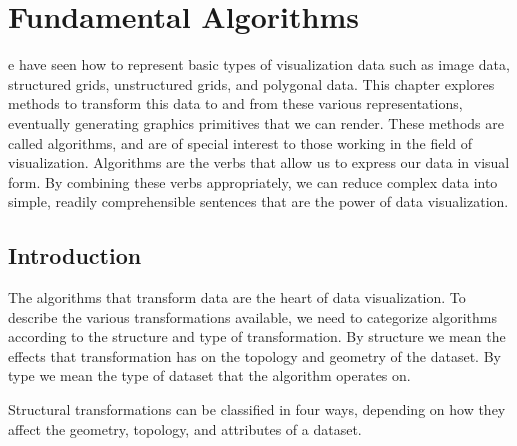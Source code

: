 \chapter{Fundamental Algorithms}
\label{chap:fundamental_algorithms}

e have seen how to represent basic types of visualization data such as image data, structured grids, unstructured grids, and polygonal data.
This chapter explores methods to transform this data to and from these various representations, eventually generating graphics primitives that we can render.
These methods are called algorithms, and are of special interest to those working in the field of visualization.
Algorithms are the verbs that allow us to express our data in visual form.
By combining these verbs appropriately, we can reduce complex data into simple, readily comprehensible sentences that are the power of data visualization.

\section{Introduction}

The algorithms that transform data are the heart of data visualization.
To describe the various transformations available, we need to categorize algorithms according to the structure and type of transformation.
By structure we mean the effects that transformation has on the topology and geometry of the dataset.
By type we mean the type of dataset that the algorithm operates on.

Structural transformations can be classified in four ways, depending on how they affect the geometry, topology, and attributes of a dataset.
